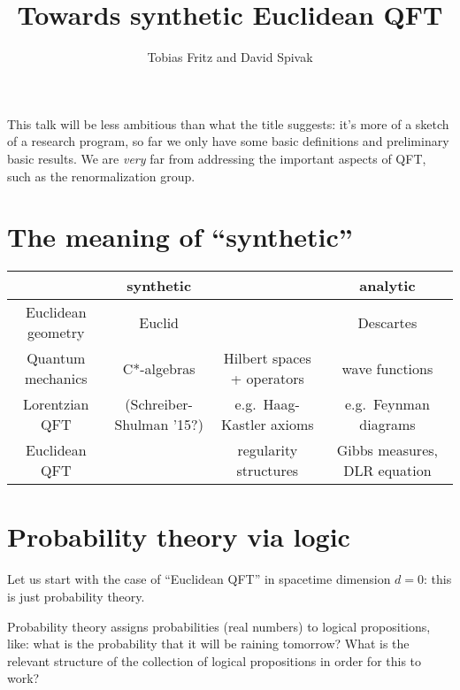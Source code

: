 \documentclass[11pt, oneside, article]{memoir}
\theoremstyle{plain}
\theoremstyle{definition}
\theoremstyle{remark}
\begin{document}
\title{Towards synthetic Euclidean QFT}

\author{Tobias Fritz and David Spivak}

\maketitle




This talk will be less ambitious than what the title suggests: it's more of a sketch of a research program, so far we only have some basic definitions and preliminary basic results. We are \emph{very} far from addressing the important aspects of QFT, such as the renormalization group.

\chapter{The meaning of ``synthetic''}

\begin{center}
\begin{tabular}{c|c|c|c}
& synthetic & & analytic \\\hline\hline
Euclidean geometry & Euclid & & Descartes \\\hline
Quantum mechanics & C*-algebras & Hilbert spaces + operators & wave functions \\\hline
Lorentzian QFT & (Schreiber-Shulman '15?) & e.g.~Haag-Kastler axioms & e.g.~Feynman diagrams \\\hline
Euclidean QFT & \fbox{\fbox{??}} & regularity structures & Gibbs measures, DLR equation
\end{tabular}
\end{center}

\chapter{Probability theory via logic}

Let us start with the case of ``Euclidean QFT'' in spacetime dimension $d = 0$: this is just probability theory.

Probability theory assigns probabilities (real numbers) to logical propositions, like: what is the probability that it will be raining tomorrow? What is the relevant structure of the collection of logical propositions in order for this to work?
\end{document}
